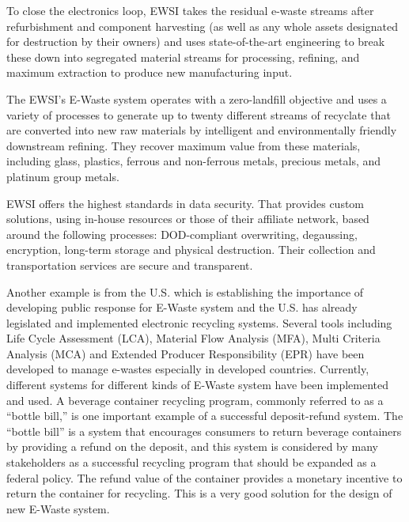 To close the electronics loop, EWSI takes the residual e-waste streams after refurbishment and component harvesting (as well as any whole assets designated for destruction by their owners) and uses state-of-the-art engineering to break these down into segregated material streams for processing, refining, and maximum extraction to produce new manufacturing input.

The EWSI's E-Waste system operates with a zero-landfill objective and uses a variety of processes to generate up to twenty different streams of recyclate that are converted into new raw materials by intelligent and environmentally friendly downstream refining. They recover maximum value from these materials, including glass, plastics, ferrous and non-ferrous metals, precious metals, and platinum group metals.

EWSI offers the highest standards in data security. That provides custom solutions, using in-house resources or those of their affiliate network, based around the following processes: DOD-compliant overwriting, degaussing, encryption, long-term storage and physical destruction. Their collection and transportation services are secure and transparent.

Another example is from the U.S. which is establishing the importance of developing public response for E-Waste system and the U.S. has already legislated and implemented electronic recycling systems. Several tools including Life Cycle Assessment (LCA), Material Flow Analysis (MFA), Multi Criteria Analysis (MCA) and Extended Producer Responsibility (EPR) have been developed to manage e-wastes especially in developed countries\cite{kiddee2013electronic}. Currently, different systems for different kinds of E-Waste system have been implemented and used. A beverage container recycling program, commonly referred
to as a “bottle bill,” is one important example of a successful deposit-refund system. The “bottle bill” is a system that encourages consumers to return beverage containers by providing a refund on the deposit, and this system is considered by many stakeholders as a successful recycling program that should be expanded as a federal policy. The refund value of the container provides a monetary incentive to return the container for recycling\cite{kahhat2008exploring}. This is a very good solution for the design of new E-Waste system.

\label{relatedwork}